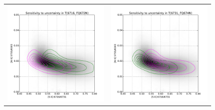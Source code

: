 \documentclass[preprint]{aastex}
\begin{document}
\begin{figure}[p]
  \centering
  \setlength\tabcolsep{0pt}
  \begin{tabular}{ll}
    \includegraphics{ratio-sensitivity-T6716-FQ672N} &
    \includegraphics{ratio-sensitivity-T6731-FQ674N} \\

\end{tabular}
\end{figure}
\end{document}
